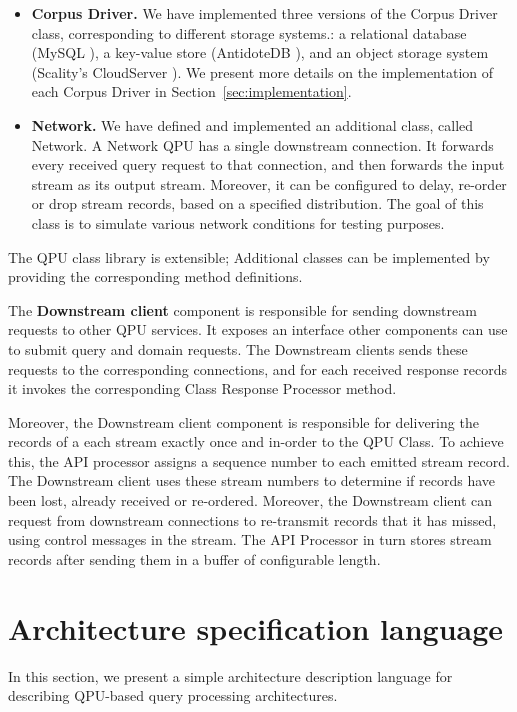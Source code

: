 \begin{itemize}
  \item \textbf{Corpus Driver.}
  We have implemented three versions of the Corpus Driver class, corresponding to different storage systems.:
  a relational database (MySQL \cite{mysql:docs}), a key-value store (AntidoteDB \cite{antidotedb:docs}),
  and an object storage system (Scality's CloudServer \cite{cloudserver:github}).
  We present more details on the implementation of each Corpus Driver in Section~\ref{sec:implementation}.

  \item \textbf{Network.}
  We have defined and implemented an additional class, called Network.
  A Network QPU has a single downstream connection.
  It forwards every received query request to that connection, and then forwards the input stream as its output stream.
  Moreover, it can be configured to delay, re-order or drop stream records, based on a specified distribution.
  The goal of this class is to simulate various network conditions for testing purposes.


\end{itemize}

The QPU class library is extensible;
Additional classes can be implemented by providing the corresponding method definitions.

\medskip
\noindent
The \textbf{Downstream client} component is responsible for sending downstream requests to other QPU services.
It exposes an interface other components can use to submit query and domain requests.
The Downstream clients sends these requests to the corresponding connections,
and for each received response records it invokes the corresponding Class Response Processor method.

Moreover, the Downstream client component is responsible for delivering the records of a each stream exactly once and in-order
to the QPU Class.
To achieve this, the API processor assigns a sequence number to each emitted stream record.
The Downstream client uses these stream numbers to determine if records have been lost, already received or re-ordered.
Moreover, the Downstream client can request from downstream connections to re-transmit records that it has missed,
using control messages in the stream.
The API Processor in turn stores stream records after sending them in a buffer of configurable length.


\section{Architecture specification language}
\label{sec:spec_language}
In this section, we present a simple architecture description language for describing QPU-based query processing architectures.


